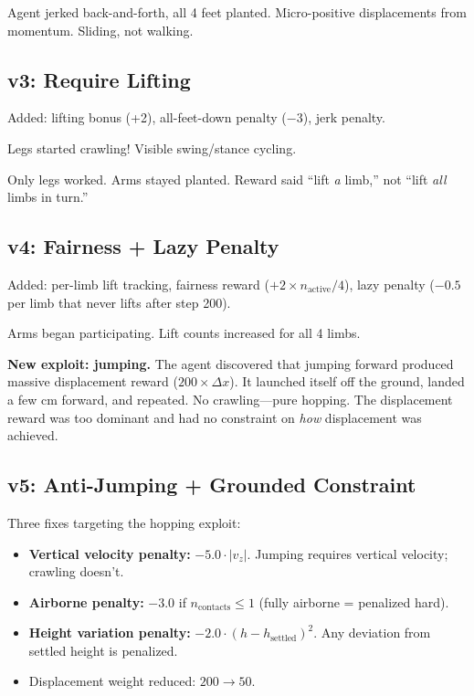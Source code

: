 \documentclass[11pt, a4paper]{article}
\begin{document}
\begin{failbox}
Agent jerked back-and-forth, all 4 feet planted. Micro-positive displacements from momentum. Sliding, not walking.
\end{failbox}

\subsection{v3: Require Lifting}
Added: lifting bonus (+2), all-feet-down penalty ($-3$), jerk penalty.

\begin{fixbox}
Legs started crawling! Visible swing/stance cycling.
\end{fixbox}
\begin{failbox}
Only legs worked. Arms stayed planted. Reward said ``lift \textit{a} limb,'' not ``lift \textit{all} limbs in turn.''
\end{failbox}

\subsection{v4: Fairness + Lazy Penalty}
Added: per-limb lift tracking, fairness reward ($+2 \times n_{\text{active}}/4$), lazy penalty ($-0.5$ per limb that never lifts after step 200).

\begin{fixbox}
Arms began participating. Lift counts increased for all 4 limbs.
\end{fixbox}
\begin{failbox}
\textbf{New exploit: jumping.} The agent discovered that jumping forward produced massive displacement reward ($200 \times \Delta x$). It launched itself off the ground, landed a few cm forward, and repeated. No crawling---pure hopping. The displacement reward was too dominant and had no constraint on \textit{how} displacement was achieved.
\end{failbox}

\subsection{v5: Anti-Jumping + Grounded Constraint}

Three fixes targeting the hopping exploit:
\begin{itemize}[nosep]
\item \textbf{Vertical velocity penalty:} $-5.0 \cdot |v_z|$. Jumping requires vertical velocity; crawling doesn't.
\item \textbf{Airborne penalty:} $-3.0$ if $n_{\text{contacts}} \leq 1$ (fully airborne = penalized hard).
\item \textbf{Height variation penalty:} $-2.0 \cdot (h - h_{\text{settled}})^2$. Any deviation from settled height is penalized.
\item Displacement weight reduced: $200 \rightarrow 50$.
\end{itemize}
\end{document}
